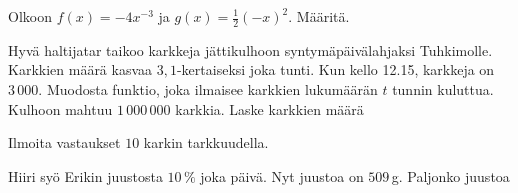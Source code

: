 \begin{tehtava}
	Olkoon $f(x)=-4x^{-3}$ ja $g(x)=\frac{1}{2}(-x)^{2}$. Määritä.
	
	
\begin{vastaus}
\end{vastaus}
\end{tehtava}
	
	\begin{tehtava}
	Hyvä haltijatar taikoo karkkeja jättikulhoon syntymäpäivälahjaksi Tuhkimolle. Karkkien määrä kasvaa $3,1$-kertaiseksi joka tunti. Kun kello 12.15, karkkeja on $3\,000$. Muodosta funktio, joka ilmaisee karkkien lukumäärän $t$ tunnin kuluttua. Kulhoon mahtuu $1\,000\,000$ karkkia. Laske karkkien määrä
	
	Ilmoita vastaukset $10$ karkin tarkkuudella.

\begin{vastaus}
\end{vastaus}
\end{tehtava}

\begin{tehtava}
	Hiiri syö Erikin juustosta $10\,\%$ joka päivä. Nyt juustoa on $509$\,g. Paljonko juustoa 
	
	
\begin{vastaus}
\end{vastaus}
\end{tehtava}

\newpage